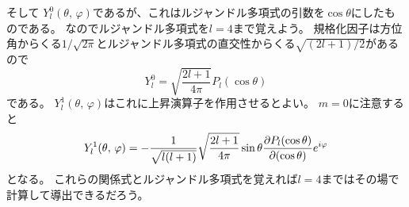 \documentclass[../../master.tex]{subfiles}
\begin{document}
そして
\(Y_l^0(\theta,\,\varphi)\)であるが、これはルジャンドル多項式の引数を\(\cos\theta\)にしたものである。
なのでルジャンドル多項式を\(l=4\)まで覚えよう。
規格化因子は方位角からくる\(1/\sqrt{2\pi}\)とルジャンドル多項式の直交性からくる\(\sqrt{(2l+1)/2}\)があるので
\begin{equation}
	Y_l^0 = \sqrt{\frac{2l+1}{4\pi}} P_l(\cos\theta)
\end{equation}
である。
\(Y_l^1(\theta,\,\varphi)\)はこれに上昇演算子を作用させるとよい。
\(m=0\)に注意すると
\begin{equation}
	Y_l^1(\theta,\,\varphi) = -\frac{1}{\sqrt{l(l+1)}}\sqrt{\frac{2l+1}{4\pi}}\sin\theta\pdv{P_l(\cos\theta)}{(\cos\theta)}e^{i\varphi}
\end{equation}
となる。
これらの関係式とルジャンドル多項式を覚えれば\(l=4\)まではその場で計算して導出できるだろう。
\end{document}
